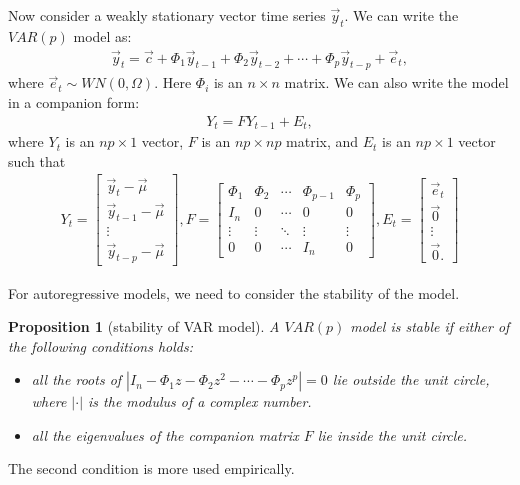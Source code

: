 \documentclass[12pt]{article}
\newtheorem{proposition}[theorem]{Proposition}
\begin{document}
Now consider a weakly stationary vector time series $\vec{y}_t$. We can write the $VAR(p)$ model as:
\begin{align*}
    \vec{y}_t = \vec{c} + \Phi_1 \vec{y}_{t-1} + \Phi_2 \vec{y}_{t-2} + \cdots + \Phi_p \vec{y}_{t-p} + \vec{e}_t,
\end{align*}
where $\vec{e}_t\sim WN(0, \Omega)$. Here $\Phi_i$ is an $n \times n$ matrix. We can also write the model in a companion form:
\begin{align*}
    Y_t = FY_{t-1} + E_t,
\end{align*}
where $Y_t$ is an $np \times 1$ vector, $F$ is an $np \times np$ matrix, and $E_t$ is an $np \times 1$ vector such that
\begin{align*}
    Y_t = \begin{bmatrix}
    \vec{y}_t - \vec{\mu}\\
    \vec{y}_{t-1} - \vec{\mu}\\
    \vdots\\
    \vec{y}_{t-p} - \vec{\mu}
    \end{bmatrix},
    F = \begin{bmatrix}
    \Phi_1 & \Phi_2 & \cdots & \Phi_{p-1} &\Phi_p\\
    I_n & 0 & \cdots & 0 & 0\\
    \vdots & \vdots & \ddots & \vdots & \vdots\\
    0 & 0 & \cdots & I_n & 0
    \end{bmatrix},
    E_t = \begin{bmatrix}
    \vec{e}_t\\
    \vec{0}\\
    \vdots\\
    \vec{0}.
    \end{bmatrix}
\end{align*}

For autoregressive models, we need to consider the stability of the model.
\begin{proposition}[stability of VAR model]
    A $VAR(p)$ model is stable if either of the following conditions holds:
    \begin{itemize}
        \item all the roots of $|I_n - \Phi_1 z - \Phi_2 z^2 - \cdots - \Phi_p z^p| = 0$ lie outside the unit circle, where $|\cdot|$ is the modulus of a complex number.
        \item all the eigenvalues of the companion matrix $F$ lie inside the unit circle.
    \end{itemize}
\end{proposition}
The second condition is more used empirically.
\end{document}
